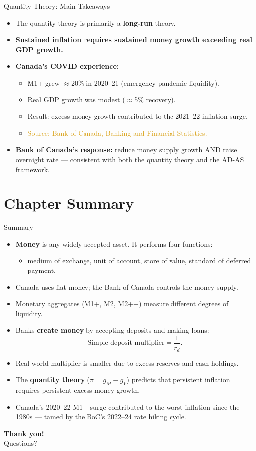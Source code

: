 \documentclass[aspectratio=169]{beamer}
\begin{document}
\begin{frame}{Quantity Theory: Main Takeaways}
\transfade
\begin{itemize}
  \item The quantity theory is primarily a \textbf{long-run} theory.
  \item \textbf{Sustained inflation requires sustained money growth exceeding real GDP growth.}
  \item \textbf{Canada's COVID experience:}
  \begin{itemize}
    \item M1+ grew $\approx$20\% in 2020--21 (emergency pandemic liquidity).
    \item Real GDP growth was modest ($\approx$5\% recovery).
    \item Result: excess money growth contributed to the 2021--22 inflation surge.
    \item \textcolor{goldenrod}{Source: Bank of Canada, Banking and Financial Statistics.}
  \end{itemize}
  \item \textbf{Bank of Canada's response:} reduce money supply growth AND raise overnight rate --- consistent with both the quantity theory and the AD-AS framework.
\end{itemize}
\end{frame}

\section*{Chapter Summary}

\begin{frame}{Summary}
\transfade
\begin{itemize}
  \item \textbf{Money} is any widely accepted asset. It performs four functions:
  \begin{itemize}
    \item medium of exchange, unit of account, store of value, standard of deferred payment.
  \end{itemize}
  \item Canada uses fiat money; the Bank of Canada controls the money supply.
  \item Monetary aggregates (M1+, M2, M2++) measure different degrees of liquidity.
  \item Banks \textbf{create money} by accepting deposits and making loans:
  \[
    \text{Simple deposit multiplier} = \frac{1}{r_d}.
  \]
  \item Real-world multiplier is smaller due to excess reserves and cash holdings.
  \item The \textbf{quantity theory} ($\pi = g_M - g_Y$) predicts that persistent inflation requires persistent excess money growth.
  \item Canada's 2020--22 M1+ surge contributed to the worst inflation since the 1980s --- tamed by the BoC's 2022--24 rate hiking cycle.
\end{itemize}
\end{frame}

\begin{frame}
\centering
\Huge \textbf{Thank you!}\\[1em]
\large Questions?
\end{frame}
\end{document}
